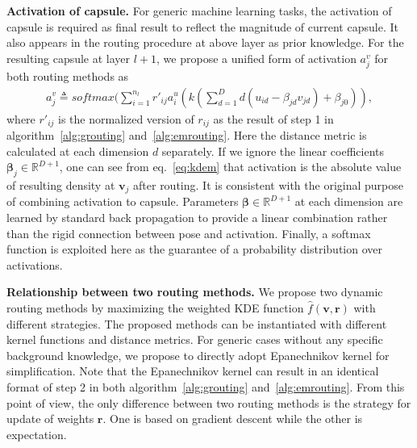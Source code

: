 \documentclass[runningheads]{llncs}
\begin{document}
\textbf{Activation of capsule.} For generic machine learning tasks, the activation of capsule is required as final result to reflect the magnitude of current capsule. It also appears in the routing procedure at above layer as prior knowledge. For the resulting capsule at layer $l+1$, we propose a unified form of activation $a_j^v$ for both routing methods as
\begin{align}
\label{eq:ajv}
a_j^v\triangleq{softmax}(\sum\limits_{i=1}^{n_l}r'_{ij}a_i^u(k(\sum\limits_{d=1}^Dd(u_{id}-\beta_{jd}v_{jd})+\beta_{j0})),
\end{align}
where $r'_{ij}$ is the normalized version of $r_{ij}$ as the result of step 1 in algorithm~\ref{alg:grouting} and~\ref{alg:emrouting}. Here the distance metric is calculated at each dimension $d$ separately. If we ignore the linear coefficients $\boldsymbol\beta_j\in\mathbb{R}^{D+1}$, one can see from eq.~\ref{eq:kdem} that activation is the absolute value of resulting density at $\boldsymbol{v}_j$ after routing. It is consistent with the original purpose of combining activation to capsule. Parameters $\boldsymbol\beta\in\mathbb{R}^{D+1}$ at each dimension are learned by standard back propagation to provide a linear combination rather than the rigid connection between pose and activation. Finally, a softmax function is exploited here as the guarantee of a probability distribution over activations.

\textbf{Relationship between two routing methods.} We propose two dynamic routing methods by maximizing the weighted KDE function $\hat{f}(\boldsymbol{v}, \boldsymbol{r})$ with different strategies. The proposed methods can be instantiated with different kernel functions and distance metrics. For generic cases without any specific background knowledge, we propose to directly adopt Epanechnikov kernel for simplification. Note that the Epanechnikov kernel can result in an identical format of step 2 in both algorithm~\ref{alg:grouting} and~\ref{alg:emrouting}. From this point of view, the only difference between two routing methods is the strategy for update of weights $\boldsymbol{r}$. One is based on gradient descent while the other is expectation.
\end{document}
